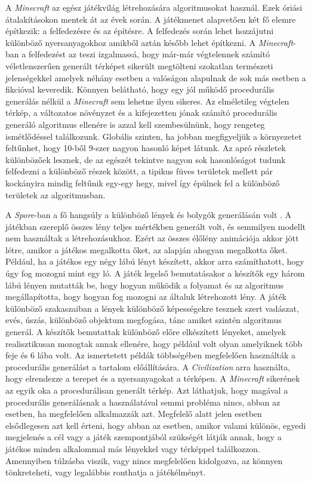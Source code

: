 A \textit{Minecraft} az egész játékvilág létrehozására algoritmusokat használ. Ezek óriási átalakításokon mentek át az évek során. A játékmenet alapvetően két fő elemre építkezik: a felfedezésre és az építésre. A felfedezés során lehet hozzájutni különböző nyersanyagokhoz amikből aztán később lehet építkezni. A \textit{Minecraft}-ban a felfedezést az teszi izgalmassá, hogy már-már végtelennek számító véletlenszerűen generált térképet sikerült megtölteni szokatlan természeti jelenségekkel amelyek néhány esetben a valóságon alapulnak de sok más esetben a fikcióval keveredik. Könnyen belátható, hogy egy jól működő procedurális generálás nélkül a \textit{Minecraft} sem lehetne ilyen sikeres. Az elméletileg végtelen térkép, a változatos növényzet és a kifejezetten jónak számító procedurális generáló algoritmus ellenére is azzal kell szembesülnünk, hogy rengeteg ismétlődéssel találkozunk. Globális szinten, ha jobban megfigyeljük a környezetet feltűnhet, hogy 10-ből 9-szer nagyon hasonló képet látunk. Az apró részletek különbözőek lesznek, de az egészét tekintve nagyon sok hasonlóságot tudunk felfedezni a különböző részek között, a tipikus füves területek mellett pár kockányira mindig feltűnik egy-egy hegy, mivel így épülnek fel a különböző területek az algoritmusban. 

A \textit{Spore}-ban a fő hangsúly a különböző lények és bolygók generálásán volt \cite{Spore}. A játékban szereplő összes lény teljes mértékben generált volt, és semmilyen modellt nem használtak a létrehozásukhoz. Ezért az összes élőlény animációja akkor jött létre, amikor a játékos megalkotta őket, az alapján ahogyan megalkotta őket. Például, ha a játékos egy négy lábú lényt készített, akkor arra számíthatott, hogy úgy fog mozogni mint egy ló. A játék legelső bemutatásakor a készítők egy három lábú lényen mutatták be, hogy hogyan működik a folyamat és az algoritmus megállapította, hogy hogyan fog mozogni az általuk létrehozott lény. A játék különböző szakaszaiban a lények különböző képességekre tesznek szert vadászat, evés, úszás, különböző objektum megfogása, tánc amiket szintén algoritmus generál. A készítők bemutattak különböző előre elkészített lényeket, amelyek realisztikusan mozogtak annak ellenére, hogy például volt olyan amelyiknek több feje és 6 lába volt.
\newpage
Az ismertetett példák többségében megfelelően használták a procedurális generálást a tartalom előállítására. A \textit{Civilization} arra használta, hogy elrendezze a terepet és a nyersanyagokat a térképen. A \textit{Minecraft} sikerének az egyik oka a procedurálisan generált térkép. Azt láthatjuk, hogy magával a procedurális generálásnak a használatával semmi probléma nincs, abban az esetben, ha megfelelően alkalmazzák azt. Megfelelő alatt jelen esetben elsődlegesen azt kell érteni, hogy abban az esetben, amikor valami különös, egyedi megjelenés a cél vagy a játék szempontjából szükségét látják annak, hogy a játékos minden alkalommal más lényekkel vagy térképpel találkozzon. Amennyiben túlzásba viszik, vagy nincs megfelelően kidolgozva, az könnyen tönkreteheti, vagy legalábbis ronthatja a játékélményt.

